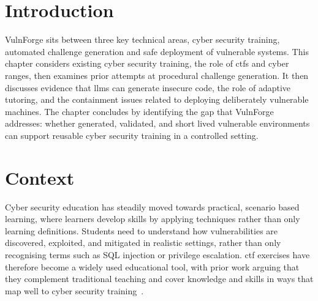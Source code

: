 %

\section{Introduction}\label{sec:background-intro}

VulnForge sits between three key technical areas, cyber security training, automated challenge generation and safe deployment of vulnerable systems. This chapter considers existing cyber security training, the role of \glspl{ctf} and cyber ranges, then examines prior attempts at procedural challenge generation. It then discusses evidence that \glspl{llm} can generate insecure code, the role of adaptive tutoring, and the containment issues related to deploying deliberately vulnerable machines. The chapter concludes by identifying the gap that VulnForge addresses: whether generated, validated, and short lived vulnerable environments can support reusable cyber security training in a controlled setting.

\section{Context}\label{sec:context}

Cyber security education has steadily moved towards practical, scenario based learning, where learners develop skills by applying techniques rather than only learning definitions. Students need to understand how vulnerabilities are discovered, exploited, and mitigated in realistic settings, rather than only recognising terms such as SQL injection or privilege escalation. \gls{ctf} exercises have therefore become a widely used educational tool, with prior work arguing that they complement traditional teaching and cover knowledge and skills in ways that map well to cyber security training~\citep{svabensky_cybersecurity_2021}.


